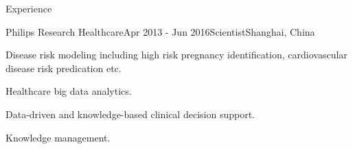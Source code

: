 \documentclass{resume} %
\begin{document}
\begin{rSection}{Experience}

\begin{rSubsection}{Philips Research Healthcare}{Apr 2013 - Jun 2016}{Scientist}{Shanghai, China}
\item Disease risk modeling including high risk pregnancy identification, cardiovascular disease risk predication etc.
\item Healthcare big data analytics.
\item Data-driven and knowledge-based clinical decision support.
\item Knowledge management.
\end{rSubsection}


\end{rSection}

\end{document}

